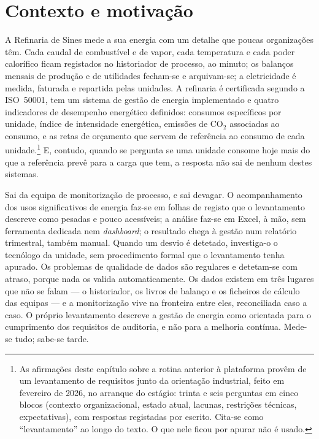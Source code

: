 \section{Contexto e motivação}
\label{sec:contexto}

A Refinaria de Sines mede a sua energia com um detalhe que poucas
organizações têm. Cada caudal de combustível e de vapor, cada temperatura
e cada poder calorífico ficam registados no historiador de processo, ao
minuto; os balanços mensais de produção e de utilidades fecham-se e
arquivam-se; a eletricidade é medida, faturada e repartida pelas
unidades. A refinaria é certificada segundo a ISO~50001, tem um sistema
de gestão de energia implementado e quatro indicadores de desempenho
energético definidos: consumos específicos por unidade, índice de
intensidade energética, emissões de CO$_2$ associadas ao consumo, e as
retas de orçamento que servem de referência ao consumo de cada
unidade.\footnote{As afirmações deste capítulo sobre a rotina anterior à
plataforma provêm de um levantamento de requisitos junto da orientação
industrial, feito em fevereiro de 2026, no arranque do estágio: trinta e
seis perguntas em cinco blocos (contexto organizacional, estado atual,
lacunas, restrições técnicas, expectativas), com respostas registadas por
escrito. Cita-se como \enquote{levantamento} ao longo do texto. O que
nele ficou por apurar não é usado.} E, contudo, quando se pergunta se uma
unidade consome hoje mais do que a referência prevê para a carga que tem,
a resposta não sai de nenhum destes sistemas.

Sai da equipa de monitorização de processo, e sai devagar. O
acompanhamento dos usos significativos de energia faz-se em folhas de
registo que o levantamento descreve como pesadas e pouco acessíveis; a
análise faz-se em Excel, à mão, sem ferramenta dedicada nem
\emph{dashboard}; o resultado chega à gestão num relatório trimestral,
também manual. Quando um desvio é detetado, investiga-o o tecnólogo da
unidade, sem procedimento formal que o levantamento tenha apurado. Os
problemas de qualidade de dados são regulares e detetam-se com atraso,
porque nada os valida automaticamente. Os dados existem em três lugares
que não se falam --- o historiador, os livros de balanço e os ficheiros
de cálculo das equipas --- e a monitorização vive na fronteira entre
eles, reconciliada caso a caso. O próprio levantamento descreve a gestão
de energia como orientada para o cumprimento dos requisitos de auditoria,
e não para a melhoria contínua. Mede-se tudo; sabe-se tarde.

